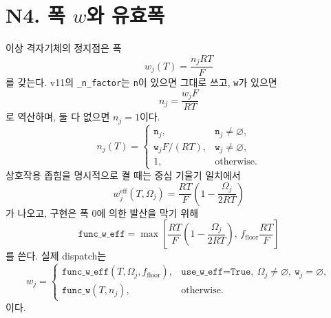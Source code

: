 \documentclass[11pt,a4paper]{article}
\newcommand{\eff}{\mathrm{eff}}
\begin{document}
\section{N4. 폭 $w$와 유효폭}\label{sec:N4}
이상 격자기체의 정지점은 폭
\begin{equation}
\boxed{\;w_j(T)=\frac{n_jRT}{F}\;}
\label{eq:w}
\end{equation}
를 갖는다. v11의 \texttt{\_n\_factor}는 \texttt{n}이 있으면 그대로 쓰고, \texttt{w}가 있으면
\begin{equation}
n_j=\frac{w_jF}{RT}
\label{eq:nfromw}
\end{equation}
로 역산하며, 둘 다 없으면 $n_j=1$이다.
\begin{equation}
n_j(T)=
\begin{cases}
\texttt{n}_j,&\texttt{n}_j\ne\varnothing,\\
\texttt{w}_jF/(RT),&\texttt{w}_j\ne\varnothing,\\
1,&\text{otherwise}.
\end{cases}
\label{eq:nfactor}
\end{equation}
상호작용 좁힘을 명시적으로 켤 때는 중심 기울기 일치에서
\begin{equation}
w_j^{\eff}(T,\Omega_j)=\frac{RT}{F}\left(1-\frac{\Omega_j}{2RT}\right)
\label{eq:weffraw}
\end{equation}
가 나오고, 구현은 폭 0에 의한 발산을 막기 위해
\begin{equation}
\boxed{\;\texttt{func\_w\_eff}=\max\!\left[
\frac{RT}{F}\left(1-\frac{\Omega_j}{2RT}\right),\,
f_{\mathrm{floor}}\frac{RT}{F}\right]\;}
\label{eq:weff}
\end{equation}
를 쓴다. 실제 dispatch는
\begin{equation}
w_j=
\begin{cases}
\texttt{func\_w\_eff}(T,\Omega_j,f_{\mathrm{floor}}),
&\texttt{use\_w\_eff=True},\ \Omega_j\ne\varnothing,\ \texttt{w}_j=\varnothing,\\
\texttt{func\_w}(T,n_j),&\text{otherwise}.
\end{cases}
\label{eq:wdispatch}
\end{equation}
이다.

\end{document}
